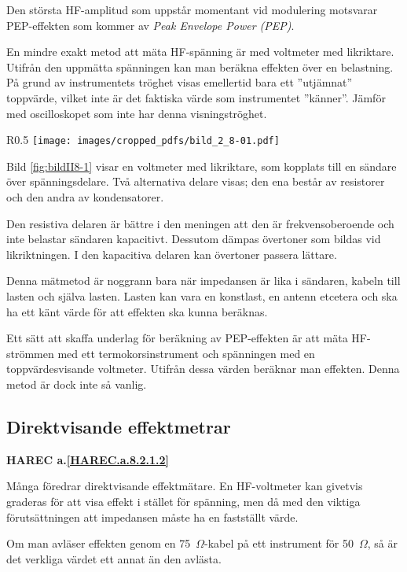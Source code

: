 Den största HF-amplitud som uppstår momentant vid modulering motsvarar
PEP-effekten som kommer av \emph{Peak Envelope Power (PEP)}.

En mindre exakt metod att mäta HF-spänning är med voltmeter med likriktare.
Utifrån den uppmätta spänningen kan man beräkna effekten över en belastning.
På grund av instrumentets tröghet visas emellertid bara ett ''utjämnat''
toppvärde, vilket inte är det faktiska värde som instrumentet ''känner''.
Jämför med oscilloskopet som inte har denna visningströghet.

\begin{wrapfigure}{R}{0.5\textwidth}
  \texttt{[image: images/cropped\_pdfs/bild\_2\_8-01.pdf]}
  \caption{Mätning av sändareffekt}
  \label{fig:bildII8-1}
\end{wrapfigure}

Bild \ref{fig:bildII8-1} visar en voltmeter med likriktare, som kopplats till
en sändare över spänningsdelare.
Två alternativa delare visas; den ena består av resistorer och den andra av
kondensatorer.

Den resistiva delaren är bättre i den meningen att den är frekvensoberoende och
inte belastar sändaren kapacitivt.
Dessutom dämpas övertoner som bildas vid likriktningen.
I den kapacitiva delaren kan övertoner passera lättare.

Denna mätmetod är noggrann bara när impedansen är lika i sändaren,
kabeln till lasten och själva lasten.
Lasten kan vara en konstlast, en antenn etcetera och ska ha ett känt värde för att
effekten ska kunna beräknas.

Ett sätt att skaffa underlag för beräkning av PEP-effekten är att mäta
HF-strömmen med ett termokorsinstrument och spänningen med en
toppvärdesvisande voltmeter.
Utifrån dessa värden beräknar man effekten.
Denna metod är dock inte så vanlig.

\subsection{Direktvisande effektmetrar}
\textbf{
HAREC a.\ref{HAREC.a.8.2.1.2}\label{myHAREC.a.8.2.1.2}
}

Många föredrar direktvisande effektmätare.
En HF-voltmeter kan givetvis graderas för att visa effekt i stället för
spänning, men då med den viktiga förutsättningen att impedansen måste ha en
fastställt värde.

Om man avläser effekten genom en 75~\(\Omega\)-kabel på ett instrument för
50~\(\Omega\), så är det verkliga värdet ett annat än den avlästa.


